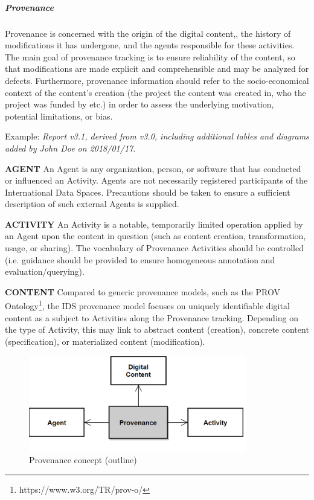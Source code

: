 \subparagraph*{Provenance}
Provenance is concerned with the origin of the digital content,, the history of modifications it has undergone, and the agents responsible for these activities. The main goal of provenance tracking is to ensure reliability of the content, so that modifications are made explicit and comprehensible and may be analyzed for defects. Furthermore, provenance information should refer to the socio-economical context of the content’s creation (the project the content was created in, who the project was funded by etc.) in order to assess the underlying motivation, potential limitations, or bias. 

Example: \textit{Report v3.1, derived from v3.0, including additional tables and diagrams added by John Doe on 2018/01/17}.



\textbf{AGENT} An Agent is any organization, person, or software that has conducted or influenced an Activity. Agents are not necessarily registered participants of the International Data Spaces. Precautions should be taken to ensure a sufficient description of such external Agents is supplied.

\textbf{ACTIVITY} An Activity is a notable, temporarily limited operation applied by an Agent upon the content in question (such as content creation, transformation, usage, or sharing). The vocabulary of Provenance Activities should be controlled (i.e. guidance should be provided to ensure homogeneous annotation and evaluation/querying).


\textbf{CONTENT} Compared to generic provenance models, such as the PROV Ontology\footnote{ https://www.w3.org/TR/prov-o/ }, the IDS provenance model focuses on uniquely identifiable digital content as a subject to Activities along the Provenance tracking. Depending on the type of Activity, this may link to abstract content (creation), concrete content (specification), or materialized content (modification). 




\begin{figure}[H]
	\begin{Center}
		\includegraphics[width=3.74in,height=1.65in]{./media/image44.png}
		\caption{Provenance concept (outline)}
		\label{fig:Provenance_concept_outline}
	\end{Center}
\end{figure}


